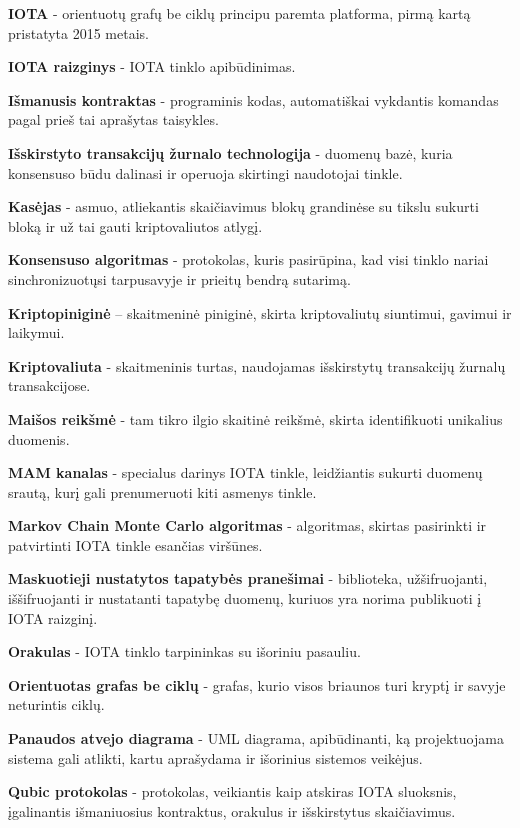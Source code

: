 \noindent \textbf{IOTA} - orientuotų grafų be ciklų principu paremta platforma, pirmą kartą pristatyta 2015 metais.

\noindent \textbf{IOTA raizginys} - IOTA tinklo apibūdinimas.

\noindent \textbf{Išmanusis kontraktas} - programinis kodas, automatiškai vykdantis komandas pagal prieš tai aprašytas taisykles.

\noindent \textbf{Išskirstyto transakcijų žurnalo technologija} - duomenų bazė, kuria konsensuso būdu dalinasi ir operuoja skirtingi naudotojai tinkle.

\noindent \textbf{Kasėjas} - asmuo, atliekantis skaičiavimus blokų grandinėse su tikslu sukurti bloką ir už tai gauti kriptovaliutos atlygį.

\noindent \textbf{Konsensuso algoritmas} - protokolas, kuris pasirūpina, kad visi tinklo nariai sinchronizuotųsi tarpusavyje ir prieitų bendrą sutarimą.

\noindent \textbf{Kriptopiniginė} – skaitmeninė piniginė, skirta kriptovaliutų siuntimui, gavimui ir laikymui.

\noindent \textbf{Kriptovaliuta} - skaitmeninis turtas, naudojamas išskirstytų transakcijų žurnalų transakcijose.

\noindent \textbf{Maišos reikšmė} - tam tikro ilgio skaitinė reikšmė, skirta identifikuoti unikalius duomenis.

\noindent \textbf{MAM kanalas} - specialus darinys IOTA tinkle, leidžiantis sukurti duomenų srautą, kurį gali prenumeruoti kiti asmenys tinkle.

\noindent \textbf{Markov Chain Monte Carlo algoritmas} - algoritmas, skirtas pasirinkti ir patvirtinti IOTA tinkle esančias viršūnes.

\noindent \textbf{Maskuotieji nustatytos tapatybės pranešimai} - biblioteka, užšifruojanti, iššifruojanti ir nustatanti tapatybę duomenų, kuriuos yra norima publikuoti į IOTA raizginį.

\noindent \textbf{Orakulas} - IOTA tinklo tarpininkas su išoriniu pasauliu.

\noindent \textbf{Orientuotas grafas be ciklų} - grafas, kurio visos briaunos turi kryptį ir savyje neturintis ciklų.

\noindent \textbf{Panaudos atvejo diagrama} - UML diagrama, apibūdinanti, ką projektuojama sistema gali atlikti, kartu aprašydama ir išorinius sistemos veikėjus. 

\noindent \textbf{Qubic protokolas} - protokolas, veikiantis kaip atskiras IOTA sluoksnis, įgalinantis išmaniuosius kontraktus, orakulus ir išskirstytus skaičiavimus.


